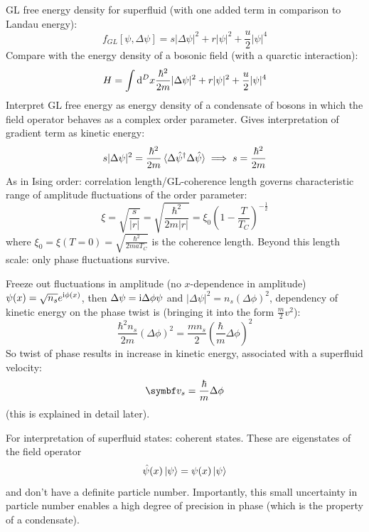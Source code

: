 \documentclass[../notes.tex]{subfiles}
\begin{document}
GL free energy density for superfluid (with one added term in comparison to Landau energy):
\begin{equation}
	f_{GL} [\psi, \Delta \psi] = s \vert \Delta \psi \vert^2 + r \vert \psi \vert^2 + \frac{u}{2} \vert \psi \vert^4
\end{equation}
Compare with the energy density of a bosonic field (with a quarctic interaction):
\begin{align}
	H = \int \odif[order=D]{x} \frac{\hbar^2}{2m} \vert \Delta \psi \vert^2 + r \vert \psi \vert^2 + \frac{u}{2} \vert \psi \vert^4
\end{align}
Interpret GL free energy as energy density of a condensate of bosons in which the field operator behaves as a complex order parameter.
Gives interpretation of gradient term as kinetic energy:
\begin{equation}
	s \vert \Delta \psi \vert^2 = \frac{\hbar^2}{2m} \braket{\Delta \hat{\psi}^{\dagger} \Delta \hat{\psi}} \implies s = \frac{\hbar^2}{2m}
\end{equation}
As in Ising order: correlation length/GL-coherence length governs characteristic range of amplitude fluctuations of the order parameter:
\begin{equation}
	\xi = \sqrt{\frac{s}{\vert r \vert}} = \sqrt{\frac{\hbar^2}{2m \vert r \vert}} = \xi_0 (1 - \frac{T}{T_C})^{-\frac{1}{2}}
\end{equation}
where \(\xi_0 = \xi(T=0) = \sqrt{\frac{\hbar^2}{2 m a T_C}}\) is the coherence length.
Beyond this length scale: only phase fluctuations survive.

Freeze out fluctuations in amplitude (no \(x\)-dependence in amplitude) \(\psi(x) = \sqrt{n_s} e^{\mathrm{i} \phi(x)}\), then \(\Delta \psi = \mathrm{i} \Delta \phi \psi\) and \(\vert \Delta \psi \vert^2 = n_s (\Delta \phi)^2\), dependency of kinetic energy on the phase twist is (bringing it into the form \(\frac{m}{2} v^2\)):
\begin{equation}
	\frac{\hbar^2 n_s}{2m} (\Delta \phi)^2 = \frac{m n_s}{2} (\frac{\hbar}{m} \Delta \phi)^2
\end{equation}
So twist of phase results in increase in kinetic energy, associated with a superfluid velocity:
\begin{equation}
	\vb{v}_s = \frac{\hbar}{m} \Delta \phi
\end{equation}
(this is explained in detail later).

For interpretation of superfluid states: coherent states.
These are eigenstates of the field operator
\begin{equation}
	\hat{\psi}(x) \ket{\psi} = \psi (x) \ket{\psi} 
\end{equation}
and don't have a definite particle number.
Importantly, this small uncertainty in particle number enables a high degree of precision in phase (which is the property of a condensate).
\end{document}
